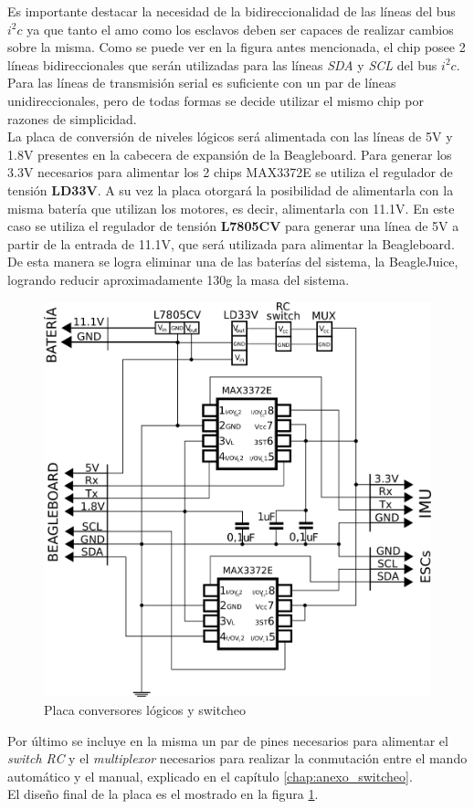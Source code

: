 \documentclass[main]{subfiles}
\begin{document}
Es importante destacar la necesidad de la bidireccionalidad de las líneas del bus $i^2c$ ya que tanto el amo como los esclavos deben ser capaces de realizar cambios sobre la misma. Como se puede ver en la figura antes mencionada, el chip posee 2 líneas bidireccionales que serán utilizadas para las líneas \emph{SDA} y \emph{SCL} del bus $i^2c$. Para las líneas de transmisión serial es suficiente con un par de líneas unidireccionales, pero de todas formas se decide utilizar el mismo chip por razones de simplicidad.\\

La placa de conversión de niveles lógicos será alimentada con las líneas de 5V y 1.8V presentes en la cabecera de expansión de la Beagleboard. Para generar los 3.3V necesarios para alimentar los 2 chips MAX3372E se utiliza el regulador de tensión \textbf{LD33V}. A su vez la placa otorgará la posibilidad de alimentarla con la misma batería que utilizan los motores, es decir, alimentarla con 11.1V. En este caso se utiliza el regulador de tensión \textbf{L7805CV} para generar una línea de 5V a partir de la entrada de 11.1V, que será utilizada para alimentar la Beagleboard. De esta manera se logra eliminar una de las baterías del sistema, la BeagleJuice, logrando reducir aproximadamente 130g la masa del sistema.\\

\begin{figure}[h!]
	\centering
	\vspace{-12pt}
	\includegraphics[width=.75\textwidth]{./pics_electronica/esquema_plaquita.png}
	\caption{Placa conversores lógicos y switcheo}
	\label{fig:plaquita}
\end{figure}

Por último se incluye en la misma un par de pines necesarios para alimentar el \emph{switch RC} y el \emph{multiplexor} necesarios para realizar la conmutación entre el mando automático y el manual, explicado en el capítulo \ref{chap:anexo_switcheo}.\\

El diseño final de la placa es el mostrado en la figura \ref{fig:plaquita}.
\end{document}
